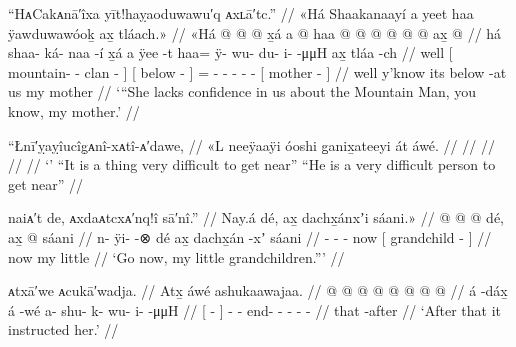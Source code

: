 \ex\label{ex:92-87-mom-lacks-confidence}%
%
\begingl
	\glpreamble	“HᴀCakᴀnā′îxa yīt!haỵaoduwawu′q ᴀxʟā′tc.” //
	\glpreamble	«\!Há Shaakanaayí a yeet haa ÿawduwawóoḵ ax̱ tláach.\!» //
	\gla	«\!Há {}  @ {} @ {} @ {} {} x̱á
		{} a  @ {} {}
		haa @  @ {} @ {} @ {} @ {} @ {}
		{} ax̱  @ {} {} //
	\glb	\pqp{}há {} shaa- ká- naa -í {} x̱á
		{} a ÿee -t {}
		haa= ÿ- wu- du- i-  -μμH
		{} ax̱ tláa -ch {} //
	\glc	\pqp{}well {}[ mountain- - clan - {}] 
		{}[  below - {}]
		= - - - -
			 -
		{}[  mother - {}] //
	\gld	\pqp{}well {}  {} {} {} {} y’know
		{} its below -at {}
		us  {} {} {} {} {}
		{} my mother {} {} //
	\glft	‘“She lacks confidence in us about the Mountain Man, you know, my mother.’
		//
\endgl
\xe

\ex\label{ex:92-88-}%
%
\begingl
	\glpreamble	“Łnī′ỵaỵîucîg̣ᴀnî-xᴀtî-ᴀ′dawe, //
	\glpreamble	«\!L neeÿaaÿi óoshi g̱anix̱ateeyi át áwé. //
	\gla	 //
	\glb	 //
	\glc	 //
	\gld	 //
	\glft	‘’\newline
		“It is a thing very difficult to get near”\newline
		“He is a very difficult person to get near”
		//
\endgl
\xe


\ex\label{ex:92-89-go-now-grandchildren}%
%
\begingl
	\glpreamble	naiᴀ′t de, ᴀxdaᴀtcxᴀ′nq!î sā′nî.” //
	\glpreamble	Nay.á dé, ax̱ dachx̱ánxʼi sáani.\!» //
	\gla	{} @ {} @ {} @ {} dé,
		{} ax̱  @ {} sáani {} //
	\glb	n- ÿi-  -⊗ dé
		{} ax̱ dachx̱án -xʼ sáani {} //
	\glc	{}- -  - now
		{}[  grandchild -  {}] //
	\gld	{} {} {} {} now
		{} my  {} little {} //
	\glft	‘Go now, my little grandchildren.”’
		//
\endgl
\xe

\ex\label{ex:92-90-she-instructed-her}%
%
\begingl
	\glpreamble	ᴀtxā′we ᴀcukā′wadja. //
	\glpreamble	Atx̱ áwé ashukaawajaa. //
	\gla	{}  @ {} {}  @ {}
		 @ {} @ {} @ {} @ {} @ {} @ {} //
	\glb	{} á -dáx̱ {} á -wé
		a- shu- k- wu- i-  -μμH //
	\glc	{}[  - {}]  -
		- end- - - -  - //
	\gld	{} that -after {}  {}
		 {} {} {} {} {} {} //
	\glft	‘After that it instructed her.’
		//
\endgl
\xe

